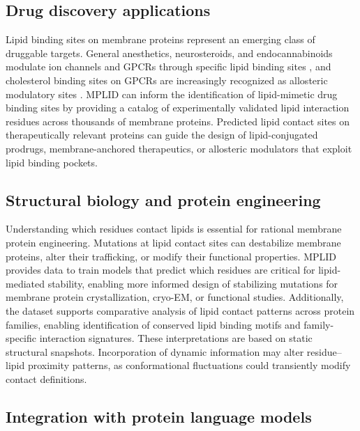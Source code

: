 \documentclass[unnumsec,webpdf,contemporary,large]{oup-authoring-template}
\begin{document}
\subsection{Drug discovery applications}

Lipid binding sites on membrane proteins represent an emerging class of druggable targets. General anesthetics, neurosteroids, and endocannabinoids modulate ion channels and GPCRs through specific lipid binding sites \cite{duncan2020, brannigan2008}, and cholesterol binding sites on GPCRs are increasingly recognized as allosteric modulatory sites \cite{hanson2008, fantini2013}. MPLID can inform the identification of lipid-mimetic drug binding sites by providing a catalog of experimentally validated lipid interaction residues across thousands of membrane proteins. Predicted lipid contact sites on therapeutically relevant proteins can guide the design of lipid-conjugated prodrugs, membrane-anchored therapeutics, or allosteric modulators that exploit lipid binding pockets.

\subsection{Structural biology and protein engineering}

Understanding which residues contact lipids is essential for rational membrane protein engineering. Mutations at lipid contact sites can destabilize membrane proteins, alter their trafficking, or modify their functional properties. MPLID provides data to train models that predict which residues are critical for lipid-mediated stability, enabling more informed design of stabilizing mutations for membrane protein crystallization, cryo-EM, or functional studies. Additionally, the dataset supports comparative analysis of lipid contact patterns across protein families, enabling identification of conserved lipid binding motifs and family-specific interaction signatures. These interpretations are based on static structural snapshots. Incorporation of dynamic information may alter residue--lipid proximity patterns, as conformational fluctuations could transiently modify contact definitions.

\subsection{Integration with protein language models}
\end{document}
